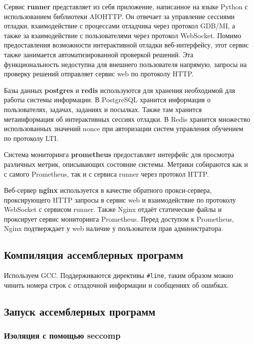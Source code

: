 \documentclass[a4paper,article,14pt]{extarticle}
\begin{document}
Сервис \textbf{runner} представляет из себя приложение, написанное на языке Python с использованием библиотеки AIOHTTP. Он отвечает за управление сессиями отладки, взаимодействие с процессами отладчика через протокол GDB/MI, а также за взаимодействие с пользователями через протокол WebSocket. Помимо предоставления возможности интерактивной отладки веб-интерфейсу, этот сервис также занимается автоматизированной проверкой решений. Эта функциональность недоступна для внешнего пользователя напрямую, запросы на проверку решений отправляет сервис web по протоколу HTTP.

Базы данных \textbf{postgres} и \textbf{redis} используются для хранения необходимой для работы системы информации. В PostgreSQL хранится информация о пользователях, задачах, заданиях и посылках. Также там хранится метаинформация об интерактивных сессиях отладки. В Redis хранится множество использованных значений nonce при авторизации систем управления обучением по протоколу LTI.

Система мониторинга \textbf{prometheus} предоставляет интерфейс для просмотра различных метрик, описывающих состояние системы. Метрики собираются как и с самого Prometheus, так и с сервиса runner через протокол HTTP.

Веб-сервер \textbf{nginx} используется в качестве обратного прокси-сервера, проксирующего HTTP запросы в сервис web и взаимодействие по протоколу WebSocket с сервисом runner. Также Nginx отдаёт статические файлы и проксирует сервис мониторинга Prometheus. Перед доступом к Prometheus, Nginx подтверждает у web наличие у пользователя прав администратора.

\subsection{Компиляция ассемблерных программ}

Используем GCC. Поддерживаются директивы \texttt{\#line}, таким образом можно чинить номера строк с отладочной информации и сообщениях об ошибках.

\subsection{Запуск ассемблерных программ}

\subsubsection{Изоляция с помощью seccomp}
\end{document}
